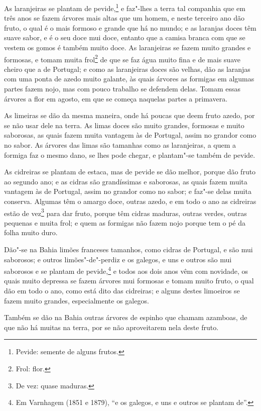 \begin{linenumbers}
As laranjeiras se plantam de pevide,\footnote{ Pevide: semente de alguns frutos.} e
faz"-lhes a terra tal companhia que em três anos se fazem árvores mais altas que um homem,
e neste terceiro ano dão fruto, o qual é o mais formoso e grande que há no mundo; e as
laranjas doces têm suave sabor, e é o seu doce mui doce, entanto que a camisa branca com
que se vestem os gomos é também muito doce. As laranjeiras se fazem muito grandes e
formosas, e tomam muita frol\footnote{Frol: flor.} de que se faz água muito fina e de
mais suave cheiro que a de Portugal; e como as laranjeiras doces são velhas, dão as
laranjas com uma ponta de azedo muito galante, às quais árvores as formigas em algumas
partes fazem nojo, mas com pouco trabalho se defendem delas. Tomam essas árvores a flor em
agosto, em que se começa naquelas partes a primavera.

As limeiras se dão da mesma maneira, onde há poucas que deem fruto azedo, por se não usar
dele na terra. As limas doces são muito grandes, formosas e muito saborosas, as quais
fazem muita vantagem às de Portugal, assim no grandor como no sabor. As árvores das limas
são tamanhas como as laranjeiras, a quem a formiga faz o mesmo dano, se lhes pode chegar,
e plantam"-se também de pevide.

As cidreiras se plantam de estaca, mas de pevide se dão melhor, porque dão fruto ao
segundo ano; e as cidras são grandíssimas e saborosas, as quais fazem muita vantagem às de
Portugal, assim no grandor como no sabor; e faz"-se delas muita conserva. Algumas têm o
amargo doce, outras azedo, e em todo o ano as cidreiras estão de vez\footnote{ De vez:
quase maduras.} para dar fruto, porque têm cidras maduras, outras verdes, outras pequenas
e muita frol; e quem as formigas não fazem nojo porque tem o pé da folha muito duro.

Dão"-se na Bahia limões franceses tamanhos, como cidras de Portugal, e são mui saborosos; e
outros limões"-de"-perdiz e os galegos, e uns e outros são mui saborosos e se plantam de
pevide,\footnote{ Em Varnhagem (1851 e 1879), ``e os galegos, e uns e outros se plantam
de''.} e todos aos dois anos vêm com novidade, os quais muito depressa se fazem árvores
mui formosas e tomam muito fruto, o qual dão em todo o ano, como está dito das cidreiras;
e alguns destes limoeiros se fazem muito grandes, especialmente os galegos.

Também se dão na Bahia outras árvores de espinho que chamam azamboas, de que não há muitas
na terra, por se não aproveitarem nela deste fruto.


\end{linenumbers}
